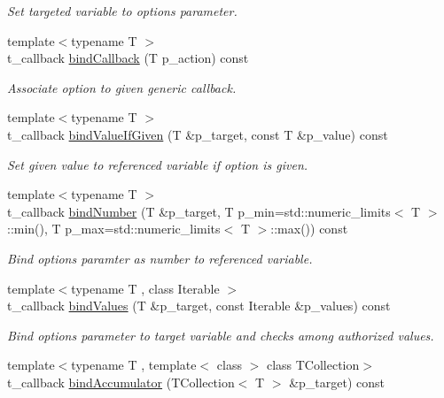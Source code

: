 \begin{DoxyCompactItemize}
\begin{DoxyCompactList}\small\item\em Set targeted variable to option\textquotesingle{}s parameter. \end{DoxyCompactList}\item 
{\footnotesize template$<$typename T $>$ }\\t\+\_\+callback \hyperlink{classxtd_1_1Application_a00f6aed6c376028a79492b04e8325968}{bind\+Callback} (T p\+\_\+action) const 
\begin{DoxyCompactList}\small\item\em Associate option to given generic callback. \end{DoxyCompactList}\item 
{\footnotesize template$<$typename T $>$ }\\t\+\_\+callback \hyperlink{classxtd_1_1Application_a2415acb66badb368e726173fb884097c}{bind\+Value\+If\+Given} (T \&p\+\_\+target, const T \&p\+\_\+value) const 
\begin{DoxyCompactList}\small\item\em Set given value to referenced variable if option is given. \end{DoxyCompactList}\item 
{\footnotesize template$<$typename T $>$ }\\t\+\_\+callback \hyperlink{classxtd_1_1Application_ae5fd6c9b1d2ad5225f9d624f63df4173}{bind\+Number} (T \&p\+\_\+target, T p\+\_\+min=std\+::numeric\+\_\+limits$<$ T $>$\+::min(), T p\+\_\+max=std\+::numeric\+\_\+limits$<$ T $>$\+::max()) const 
\begin{DoxyCompactList}\small\item\em Bind option\textquotesingle{}s paramter as number to referenced variable. \end{DoxyCompactList}\item 
{\footnotesize template$<$typename T , class Iterable $>$ }\\t\+\_\+callback \hyperlink{classxtd_1_1Application_aaa0388f1c96893a26cfe5522b0804dd9}{bind\+Values} (T \&p\+\_\+target, const Iterable \&p\+\_\+values) const 
\begin{DoxyCompactList}\small\item\em Bind option\textquotesingle{}s parameter to target variable and checks among authorized values. \end{DoxyCompactList}\item 
{\footnotesize template$<$typename T , template$<$ class $>$ class T\+Collection$>$ }\\t\+\_\+callback \hyperlink{classxtd_1_1Application_a846da30aaf55754027608ddf5c689366}{bind\+Accumulator} (T\+Collection$<$ T $>$ \&p\+\_\+target) const 

\end{DoxyCompactItemize}
